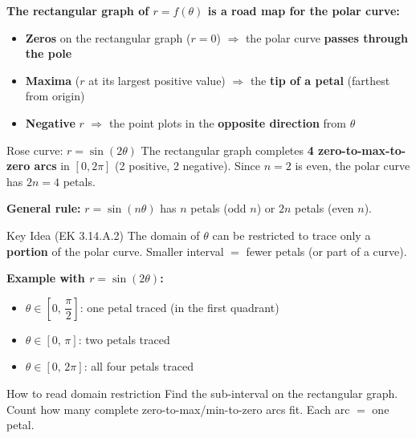 \documentclass[aspectratio=169, 11pt]{beamer}
\begin{document}
\begin{frame}[t, plain]

  \textbf{The rectangular graph of $r = f(\theta)$ is a road map for the polar curve:}

  \vspace{0.3cm}
  \begin{itemize}
    \item \textbf{Zeros} on the rectangular graph ($r = 0$) $\Rightarrow$ the polar curve
      \textbf{passes through the pole}
    \item \textbf{Maxima} ($r$ at its largest positive value) $\Rightarrow$
      the \textbf{tip of a petal} (farthest from origin)
    \item \textbf{Negative} $r$ $\Rightarrow$ the point plots in the
      \textbf{opposite direction} from $\theta$
  \end{itemize}

  \vspace{0.4cm}
  \begin{block}{Rose curve: $r = \sin(2\theta)$}
    The rectangular graph completes \textbf{4 zero-to-max-to-zero arcs} in $[0, 2\pi]$
    (2 positive, 2 negative). Since $n = 2$ is even, the polar curve has $2n = 4$ petals.
  \end{block}

  \vspace{0.3cm}
  \textbf{General rule:} $r = \sin(n\theta)$ has $n$ petals (odd $n$) or $2n$ petals (even $n$).
\end{frame}

\begin{frame}[t, plain]

  \begin{block}{Key Idea (EK 3.14.A.2)}
    The domain of $\theta$ can be restricted to trace only a \textbf{portion} of
    the polar curve. Smaller interval $=$ fewer petals (or part of a curve).
  \end{block}

  \vspace{0.4cm}
  \textbf{Example with $r = \sin(2\theta)$:}

  \vspace{0.3cm}
  \begin{itemize}
    \item $\theta \in \left[0,\, \dfrac{\pi}{2}\right]$:
      one petal traced (in the first quadrant)
    \item $\theta \in [0,\, \pi]$:
      two petals traced
    \item $\theta \in [0,\, 2\pi]$:
      all four petals traced
  \end{itemize}

  \vspace{0.4cm}
  \begin{block}{How to read domain restriction}
    Find the sub-interval on the rectangular graph. Count how many complete
    zero-to-max/min-to-zero arcs fit. Each arc $=$ one petal.
  \end{block}
\end{frame}
\end{document}
